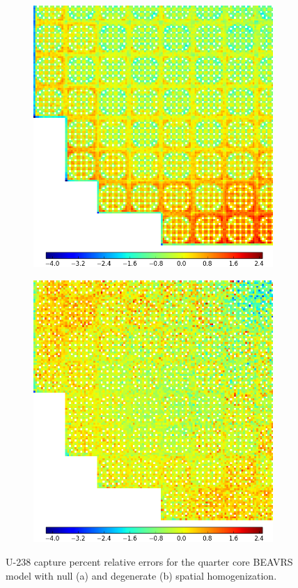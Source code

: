 \begin{figure}[h!]
\centering
\begin{subfigure}{0.9\textwidth}
  \centering
  \includegraphics[width=0.65\linewidth]{figures/results/spatial/full-core/capt-err-null}
  \caption{}
  \label{fig:chap11-full-core-capt-err-null}
\end{subfigure}
\begin{subfigure}{0.9\textwidth}
  \centering
\includegraphics[width=0.65\linewidth]{figures/results/spatial/full-core/capt-err-degenerate}
  \caption{}
  \label{fig:chap11-full-core-capt-err-degenerate}
\end{subfigure}
\caption[U-238 capture rate errors for \ac{BEAVRS}]{U-238 capture percent relative errors for the quarter core \ac{BEAVRS} model with null (a) and degenerate (b) spatial homogenization.}
\label{fig:chap11-full-core-capt-err-a}
\end{figure}


